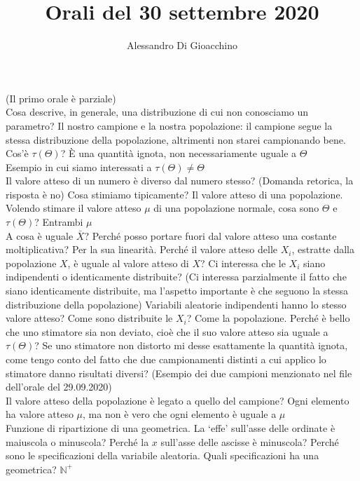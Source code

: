 \documentclass{article}
\title{Orali del 30 settembre 2020}
\author{Alessandro Di Gioacchino}
\begin{document}
    \maketitle
    
    (Il primo orale è parziale) \\
    Cosa descrive, in generale, una distribuzione di cui non conosciamo un parametro? Il nostro campione e la nostra popolazione: il campione segue la stessa distribuzione
    della popolazione, altrimenti non starei campionando bene. Cos'è $ \tau ( \Theta ) $? È una quantità ignota, non necessariamente uguale a $ \Theta $ \\
    Esempio in cui siamo interessati a $ \tau ( \Theta ) \neq \Theta $ \\
    Il valore atteso di un numero è diverso dal numero stesso? (Domanda retorica, la risposta è no) Cosa stimiamo tipicamente? Il valore atteso di una popolazione. \\
    Volendo stimare il valore atteso $ \mu $ di una popolazione normale, cosa sono $ \Theta $ e $ \tau ( \Theta ) $? Entrambi $ \mu $ \\
    A cosa è uguale $ \bar X $? Perché posso portare fuori dal valore atteso una costante moltiplicativa? Per la sua linearità. Perché il valore atteso delle $ X_i $, estratte
    dalla popolazione $ X $, è uguale al valore atteso di $ X $? Ci interessa che le $ X_i $ siano indipendenti o identicamente distribuite? (Ci interessa parzialmente il fatto che
    siano identicamente distribuite, ma l'aspetto importante è che seguono la stessa distribuzione della popolazione) Variabili aleatorie indipendenti hanno lo stesso valore atteso?
    Come sono distribuite le $ X_i $? Come la popolazione. Perché è bello che uno stimatore sia non deviato, cioè che il suo valore atteso sia uguale a $ \tau ( \Theta ) $? Se uno
    stimatore non distorto mi desse esattamente la quantità ignota, come tengo conto del fatto che due campionamenti distinti a cui applico lo stimatore danno risultati diversi?
    (Esempio dei due campioni menzionato nel file dell'orale del 29.09.2020) \\
    Il valore atteso della popolazione è legato a quello del campione? Ogni elemento ha valore atteso $ \mu $, ma non è vero che ogni elemento è uguale a $ \mu $ \\
    Funzione di ripartizione di una geometrica. La ‘effe’ sull'asse delle ordinate è maiuscola o minuscola? Perché la $ x $ sull'asse delle ascisse è minuscola? Perché sono le
    specificazioni della variabile aleatoria. Quali specificazioni ha una geometrica? $ \mathbb N^+ $ \\
\end{document}
